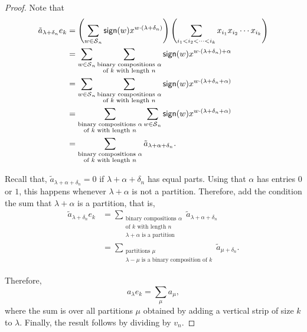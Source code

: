 \begin{proof}
    Note that
    \begin{align}
        \tilde{a}_{\lambda + \delta_n} e_k
        &=
        \left(
            \sum_{w \in \operatorname{\mathcal{S}}_n} \operatorname{\mathsf{sign}}(w) x^{w \cdot (\lambda + \delta_n)} 
        \right) 
        \left(
            \sum_{i_1 < i_2 < \cdots < i_k} x_{i_1} x_{i_2} \cdots x_{i_k}
        \right) \\
        &=
        \sum_{w \in \operatorname{\mathcal{S}}_n}
        \sum_{\substack{\text{binary compositions } \alpha \\ \text{of } k \text{ with length } n}}
        \operatorname{\mathsf{sign}}(w) x^{w \cdot (\lambda + \delta_n) + \alpha} \\
        &=
        \sum_{w \in \operatorname{\mathcal{S}}_n}
        \sum_{\substack{\text{binary compositions } \alpha \\ \text{of } k \text{ with length } n}}
        \operatorname{\mathsf{sign}}(w) x^{w \cdot (\lambda + \delta_n + \alpha)} \\
        &=
        \sum_{\substack{\text{binary compositions } \alpha \\ \text{of } k \text{ with length } n}}
        \sum_{w \in \operatorname{\mathcal{S}}_n}
        \operatorname{\mathsf{sign}}(w) x^{w \cdot (\lambda + \delta_n + \alpha)} \\
        &=
        \sum_{\substack{\text{binary compositions } \alpha \\ \text{of } k \text{ with length } n}}
        \tilde{a}_{\lambda + \alpha + \delta_n}.
    \end{align}

    Recall that, \(\tilde{a}_{\lambda + \alpha + \delta_n} = 0\) if \(\lambda + \alpha + \delta_n\) has equal parts.
    Using that \(\alpha\) has entries \(0\) or \(1\), this happens whenever \(\lambda + \alpha\) is not a partition.
    Therefore, add the condition the sum that \(\lambda + \alpha\) is a partition, that is,
    \begin{align}
        \tilde{a}_{\lambda + \delta_n} e_k
        &= \sum_{\substack{\text{binary compositions } \alpha \\ \text{of } k \text{ with length } n \\ \lambda + \alpha \text{ is a partition}}}
        \tilde{a}_{\lambda + \alpha + \delta_n} \\
        &= \sum_{\substack{\text{partitions } \mu \\ \lambda - \mu \text{ is a binary composition of } k}}
        \tilde{a}_{\mu + \delta_n}.
    \end{align}

    Therefore,
    \begin{equation}
        a_\lambda e_k = \sum_{\mu} a_{\mu},
    \end{equation}
    where the sum is over all partitions \(\mu\) obtained by adding a vertical strip of size \(k\) to \(\lambda\).
    Finally, the result follows by dividing by \(v_n\).
\end{proof}

